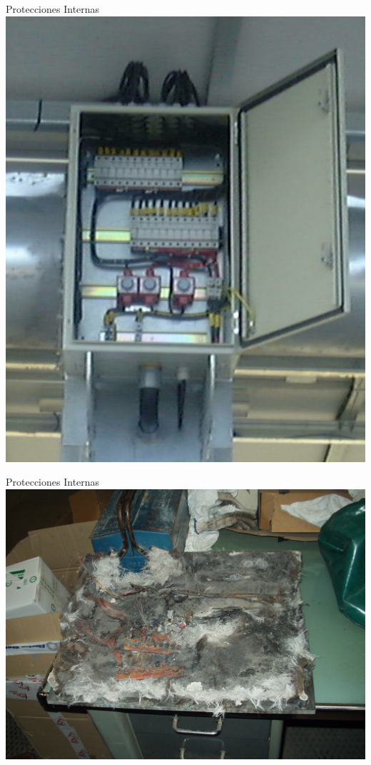 \documentclass[xcolor={usenames,svgnames,dvipsnames}]{beamer}
\begin{document}
\begin{frame}[label=sec-4-2-6]{Protecciones Internas}
\includegraphics[height=0.8\textheight]{../figs/CajaProteccionesPhotocampa.pdf}
\end{frame}

\begin{frame}[label=sec-4-2-7]{Protecciones Internas}
\includegraphics[width=.9\linewidth]{../figs/CajaForumDestruida.pdf}
\end{frame}
\end{document}
